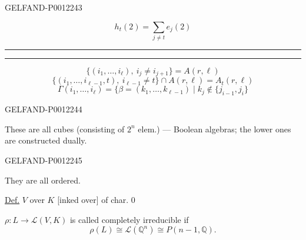 \begin{GelfandAdjacentEvidence}{GELFAND-P001224}{3}

\begin{equation*}
h_t(2)=\sum_{j\ne t}e_j(2)
\end{equation*}
\begin{center}\rule{.9em}{.35pt}\quad\rule{.9em}{.35pt}\end{center}
\begin{equation*}
\{(i_1,\ldots,i_\ell),\ i_j\ne i_{j+1}\}=A(r,\ell)
\end{equation*}
\begin{equation*}
\{(i_1,\ldots,i_{\ell-1},t),\ i_{\ell-1}\ne t\}\cap A(r,\ell)=A_t(r,\ell)
\end{equation*}
\begin{equation*}
\Gamma(i_1,\ldots,i_\ell)=\{\beta=(k_1,\ldots,k_{\ell-1})\mid k_j\notin\{j_{i-1},j_i\}
\end{equation*}
\end{GelfandAdjacentEvidence}
\begin{GelfandAdjacentEvidence}{GELFAND-P001224}{4}


These are all cubes (consisting of \(2^n\) elem.) --- Boolean algebras;
the lower ones are constructed dually.
\end{GelfandAdjacentEvidence}
\begin{GelfandAdjacentEvidence}{GELFAND-P001224}{5}


They are all ordered.

\underline{Def.} \(V\) over \(K\) [inked over] of char. \(0\)
\end{GelfandAdjacentEvidence}


\(\rho:L\longrightarrow\mathcal L(V,K)\) is called completely irreducible if
\begin{equation*}
\rho(L)\cong\mathcal L(\mathbb Q^n)\cong P(n-1,\mathbb Q).
\end{equation*}


